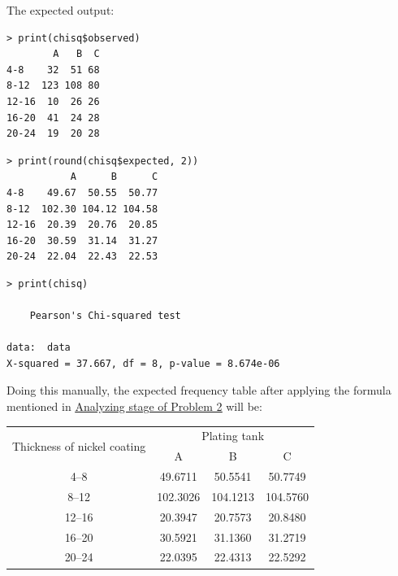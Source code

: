 \documentclass[a4paper]{article}
\numberwithin{equation}{section}
\begin{document}
The expected output:
\begin{mdframed}[leftline=false,rightline=false,backgroundcolor=gray!10,nobreak=true]
  \begin{verbatim}
> print(chisq$observed)
        A   B  C
4-8    32  51 68
8-12  123 108 80
12-16  10  26 26
16-20  41  24 28
20-24  19  20 28
  \end{verbatim}
  \begin{verbatim}
> print(round(chisq$expected, 2))
           A      B      C
4-8    49.67  50.55  50.77
8-12  102.30 104.12 104.58
12-16  20.39  20.76  20.85
16-20  30.59  31.14  31.27
20-24  22.04  22.43  22.53
  \end{verbatim}
  \begin{verbatim}
> print(chisq)

	Pearson's Chi-squared test

data:  data
X-squared = 37.667, df = 8, p-value = 8.674e-06
  \end{verbatim}
\end{mdframed}

Doing this manually, the expected frequency table after applying the formula mentioned in \hyperref[p2:anal]{\underline{Analyzing stage of Problem 2}} will be:

\begin{center}
  \begin{tabular}{cccc}
    \toprule
    \multirow{2}{*}{Thickness of nickel coating} & \multicolumn{3}{c}{Plating tank}                       \\
    \cmidrule(lr){2-4}
                                                 & A                                & B        & C        \\
    \midrule
    4--8                                         & 49.6711                          & 50.5541  & 50.7749  \\
    8--12                                        & 102.3026                         & 104.1213 & 104.5760 \\
    12--16                                       & 20.3947                          & 20.7573  & 20.8480  \\
    16--20                                       & 30.5921                          & 31.1360  & 31.2719  \\
    20--24                                       & 22.0395                          & 22.4313  & 22.5292  \\
    \bottomrule
  \end{tabular}
\end{center}
\end{document}
